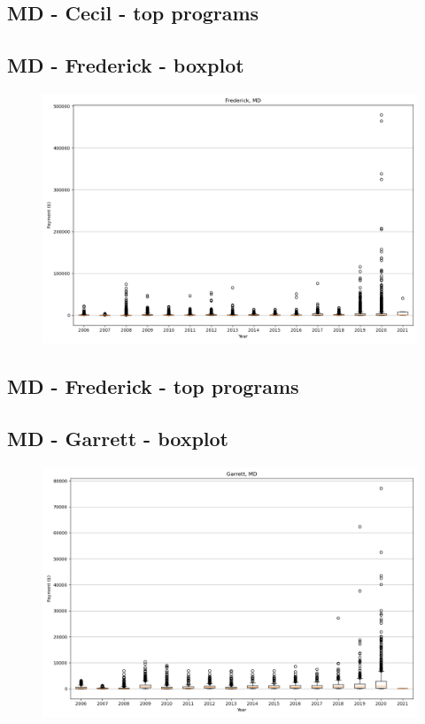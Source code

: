 \subsection*{MD - Cecil - top programs}

\newpage
\subsection*{MD - Frederick - boxplot}
\begin{figure}[h]
\centering
\includegraphics[width=7in]{../output/boxplots/counties/Frederick-MD_boxplot.png}
\end{figure}


\subsection*{MD - Frederick - top programs}

\newpage
\subsection*{MD - Garrett - boxplot}
\begin{figure}[h]
\centering
\includegraphics[width=7in]{../output/boxplots/counties/Garrett-MD_boxplot.png}
\end{figure}


